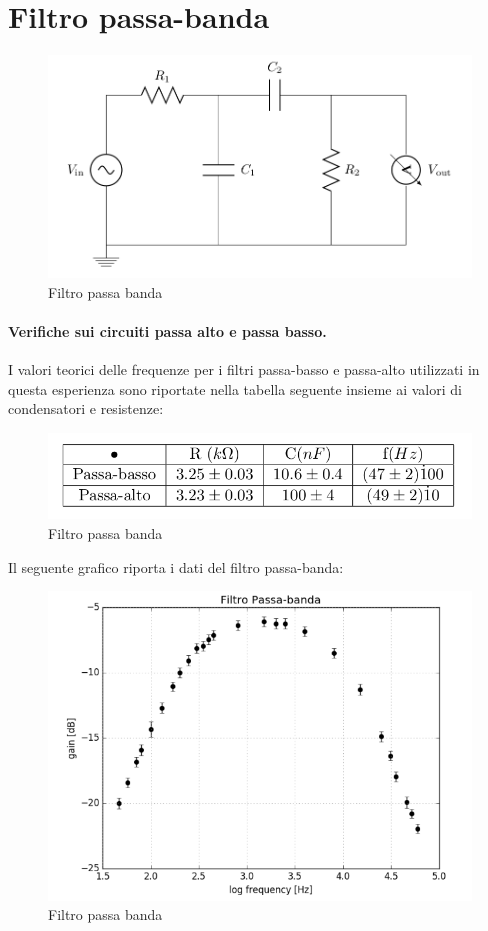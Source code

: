 \documentclass[10pt,a4paper]{article}
\begin{document}
\section{Filtro passa-banda}

\begin{figure}[h]
\centering
\includegraphics[scale=0.4]{passabanda.png}
\caption{Filtro passa banda}
\end{figure}

\paragraph{Verifiche sui circuiti passa alto e passa basso.}
I valori teorici delle frequenze per i filtri passa-basso e passa-alto utilizzati in questa esperienza sono riportate nella tabella seguente insieme ai valori di condensatori e resistenze:

\begin{figure}[h]
\centering
\includegraphics[scale=0.4]{tabella2.png}
\caption{Filtro passa banda}
\end{figure}

Il seguente grafico riporta i dati del filtro passa-banda:

\begin{figure}[h]
\centering
\includegraphics[scale=0.4]{immagine5.png}
\caption{Filtro passa banda}
\end{figure}
\end{document}
